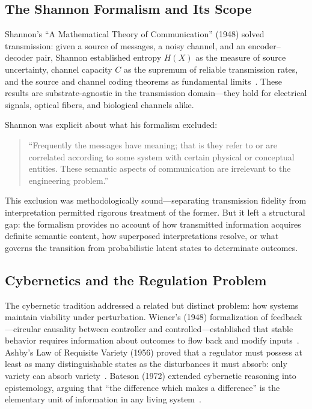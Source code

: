 \documentclass[11pt]{article}
\theoremstyle{plain}
\begin{document}
\subsection{The Shannon Formalism and Its Scope}

Shannon's ``A Mathematical Theory of Communication'' (1948) solved transmission: given a source
of messages, a noisy channel, and an encoder--decoder pair, Shannon established entropy $H(X)$ as
the measure of source uncertainty, channel capacity $C$ as the supremum of reliable transmission
rates, and the source and channel coding theorems as fundamental limits~\cite{shannon1948}. These
results are substrate-agnostic in the transmission domain---they hold for electrical signals,
optical fibers, and biological channels alike.

Shannon was explicit about what his formalism excluded:
\begin{quote}
``Frequently the messages have meaning; that is they refer to or are correlated according
to some system with certain physical or conceptual entities. These semantic aspects of
communication are irrelevant to the engineering problem.''~\cite{shannon1948}
\end{quote}

This exclusion was methodologically sound---separating transmission fidelity from interpretation
permitted rigorous treatment of the former. But it left a structural gap: the formalism provides
no account of how transmitted information acquires definite semantic content, how superposed
interpretations resolve, or what governs the transition from probabilistic latent states to
determinate outcomes.

\subsection{Cybernetics and the Regulation Problem}

The cybernetic tradition addressed a related but distinct problem: how systems maintain viability
under perturbation. Wiener's (1948) formalization of feedback---circular causality between
controller and controlled---established that stable behavior requires information about outcomes
to flow back and modify inputs~\cite{wiener1948}. Ashby's Law of Requisite Variety (1956) proved
that a regulator must possess at least as many distinguishable states as the disturbances it must
absorb: only variety can absorb variety~\cite{ashby1956}. Bateson (1972) extended cybernetic
reasoning into epistemology, arguing that ``the difference which makes a difference'' is the
elementary unit of information in any living system~\cite{bateson1972}.
\end{document}
